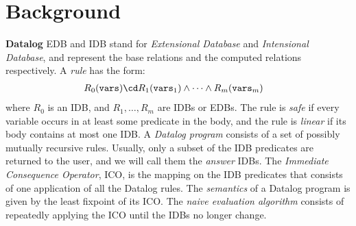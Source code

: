 
\section{Background}

\label{sec:background}


{\bf Datalog}  EDB and
IDB stand for {\em Extensional Database} and {\em Intensional
  Database}, and represent the base relations and the computed
relations respectively.  A {\em rule} has the form:
%
\begin{align*}
  R_0(\texttt{vars}) \cd & R_1(\texttt{vars}_1) \wedge \cdots \wedge R_m(\texttt{vars}_m)
\end{align*}
%
where $R_0$ is an IDB, and $R_1, \ldots, R_m$ are IDBs or EDBs.  The
rule is {\em safe} if every variable occurs in at least some predicate
in the body, and the rule is {\em linear} if its body contains at most
one IDB.  A {\em Datalog program} consists of a set of possibly
mutually recursive rules.  Usually, only a subset of the IDB
predicates are returned to the user, and we will call them the {\em
  answer} IDBs.  The {\em Immediate Consequence Operator}, ICO, is the
mapping on the IDB predicates that consists of one application of all
the Datalog rules.  The {\em semantics} of a Datalog program is given
by the least fixpoint of its ICO.  The {\em naive evaluation
  algorithm} consists of repeatedly applying the ICO until the IDBs no
longer change.


